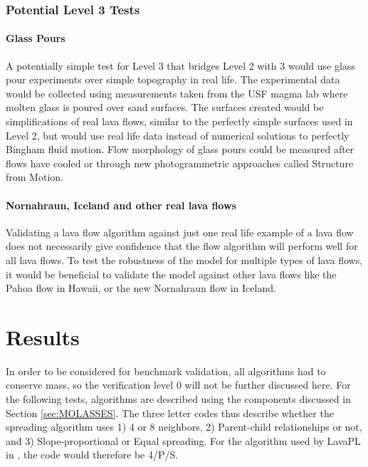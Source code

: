 \documentclass[12pt,letter]{article}
\begin{document}
		\subsubsection{Potential Level 3 Tests}
		\paragraph{Glass Pours}
			A potentially simple test for Level 3 that bridges Level 2 with 3 would use glass pour experiments over simple topography in real life. The experimental data would be collected using measurements taken from the USF magma lab where molten glass is poured over sand surfaces. The surfaces created would be simplifications of real lava flows, similar to the perfectly simple surfaces used in Level 2, but would use real life data instead of numerical solutions to perfectly Bingham fluid motion. Flow morphology of glass pours could be measured after flows have cooled or through new photogrammetric approaches called Structure from Motion.
			
		\paragraph{Nornahraun, Iceland and other real lava flows}
			Validating a lava flow algorithm against just one real life example of a lava flow does not necessarily give confidence that the flow algorithm will perform well for all lava flows. To test the robustness of the model for multiple types of lava flows, it would be beneficial to validate the model against other lava flows like the Pahoa flow in Hawaii, or the new Nornahraun flow in Iceland.
			
		


\section{Results}\label{sec:BMResults}
	
	In order to be considered for benchmark validation, all algorithms had to conserve mass, so the verification level 0 will not be further discussed here. For the following tests, algorithms are described using the components discussed in Section \ref{sec:MOLASSES}. The three letter codes thus describe whether the spreading algorithm uses 1) 4 or 8 neighbors, 2) Parent-child relationships or not, and 3) Slope-proportional or Equal spreading. For the algorithm used by LavaPL in \citet{connor2012}, the code would therefore be 4/P/S.
\end{document}
